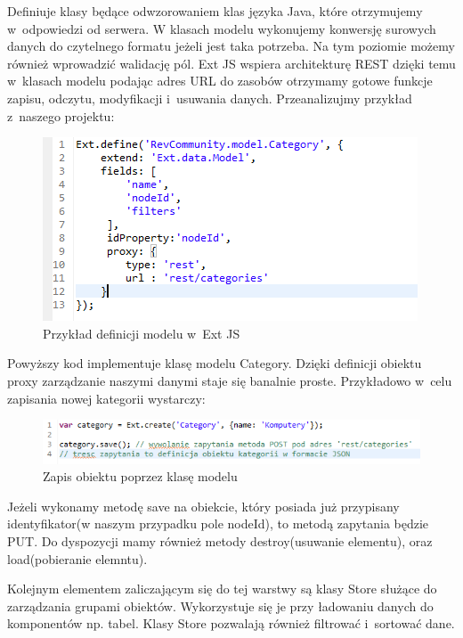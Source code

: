 Definiuje klasy będące odwzorowaniem klas języka Java, które otrzymujemy w~odpowiedzi od serwera. W klasach modelu wykonujemy konwersję surowych danych do czytelnego formatu jeżeli jest taka potrzeba. Na tym poziomie możemy również wprowadzić walidację pól. Ext JS wspiera architekturę REST dzięki temu w~klasach modelu podając adres URL do zasobów otrzymamy gotowe funkcje zapisu, odczytu, modyfikacji i~usuwania danych. Przeanalizujmy przykład z~naszego projektu:

\begin{figure}[H]
	\centering
	\includegraphics[width=\textwidth]{images/ext_model.png}
	\caption{Przykład definicji modelu w~Ext JS}
\end{figure}

Powyższy kod implementuje klasę modelu Category. Dzięki definicji obiektu proxy zarządzanie naszymi danymi staje się banalnie proste. Przykładowo w~celu zapisania nowej kategorii wystarczy:

\begin{figure}[H]
	\centering
	\includegraphics[width=\textwidth]{images/save_model.png}
	\caption{Zapis obiektu poprzez klasę modelu}
\end{figure}

Jeżeli wykonamy metodę save na obiekcie, który posiada już przypisany identyfikator(w naszym przypadku pole nodeId), to metodą zapytania będzie PUT.
Do dyspozycji mamy również metody destroy(usuwanie elementu), oraz load(pobieranie elemntu).

Kolejnym elementem zaliczającym się do tej warstwy są klasy Store służące do zarządzania grupami obiektów. Wykorzystuje się je przy ładowaniu danych do komponentów np. tabel. 
Klasy Store pozwalają również filtrować i~sortować dane.

